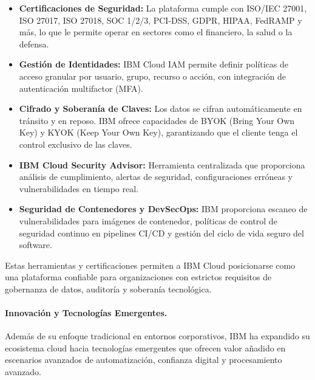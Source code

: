 {                \begin{itemize}
                    \item \textbf{Certificaciones de Seguridad:} La plataforma cumple con ISO/IEC 27001, ISO 27017, ISO 27018, SOC 1/2/3, PCI-DSS, GDPR, HIPAA, FedRAMP y más, lo que le permite operar en sectores como el financiero, la salud o la defensa.
                    \item \textbf{Gestión de Identidades:} IBM Cloud IAM permite definir políticas de acceso granular por usuario, grupo, recurso o acción, con integración de autenticación multifactor (MFA).
                    \item \textbf{Cifrado y Soberanía de Claves:} Los datos se cifran automáticamente en tránsito y en reposo. IBM ofrece capacidades de BYOK (Bring Your Own Key) y KYOK (Keep Your Own Key), garantizando que el cliente tenga el control exclusivo de las claves.
                    \item \textbf{IBM Cloud Security Advisor:} Herramienta centralizada que proporciona análisis de cumplimiento, alertas de seguridad, configuraciones erróneas y vulnerabilidades en tiempo real.
                    \item \textbf{Seguridad de Contenedores y DevSecOps:} IBM proporciona escaneo de vulnerabilidades para imágenes de contenedor, políticas de control de seguridad continuo en pipelines CI/CD y gestión del ciclo de vida seguro del software.
                \end{itemize}
                
                Estas herramientas y certificaciones permiten a IBM Cloud posicionarse como una plataforma confiable para organizaciones con estrictos requisitos de gobernanza de datos, auditoría y soberanía tecnológica.
                
                \paragraph{Innovación y Tecnologías Emergentes.}
                Además de su enfoque tradicional en entornos corporativos, IBM ha expandido su ecosistema cloud hacia tecnologías emergentes que ofrecen valor añadido en escenarios avanzados de automatización, confianza digital y procesamiento avanzado.
                
}

